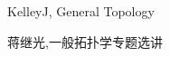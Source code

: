 \documentclass[main.tex]{subfiles}
\begin{document}
	
	KelleyJ, General Topology \cite{KelleyJ}
	
	蒋继光,一般拓扑学专题选讲\cite{JiangJi}
	
	
	
\end{document}
